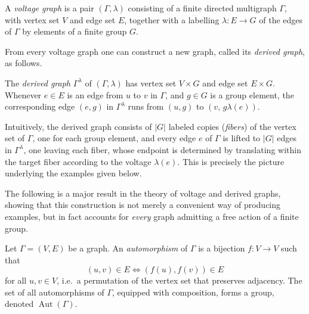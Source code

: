 \begin{definition}
    \label{def:classical-voltage-graph}
    A \emph{voltage graph} is a pair \( (\Gamma, \lambda) \) consisting
    of a finite directed multigraph \( \Gamma \),
    with vertex set \( V \) and edge set \( E \), together with a
    labelling \( \lambda \colon E \to G \) of the edges of \( \Gamma \)
    by elements of a finite group \( G \).
\end{definition}

From every voltage graph one can construct a new graph, called its
\emph{derived graph}, as follows.

\begin{definition}
    \label{def:classical-derived-graph}
    The \emph{derived graph} \( \Gamma^\lambda \) of \( (\Gamma,\lambda) \)
    has vertex set \( V \times G \) and edge set \( E \times G \).
    Whenever \( e \in E \) is an edge from \( u \) to \( v \) in
    \( \Gamma \), and \( g \in G \) is a group element, the
    corresponding edge \( (e,g) \) in \( \Gamma^\lambda \) runs from
    \( (u,g) \) to \( (v,\, g\lambda(e)) \).
\end{definition}

Intuitively, the derived graph consists of \( |G| \) labeled copies
(\emph{fibers}) of the vertex set of \( \Gamma \), one for each group
element, and every edge \( e \) of \( \Gamma \) is lifted to \( |G| \)
edges in \( \Gamma^\lambda \), one leaving each fiber, whose endpoint
is determined by translating within the target fiber according to the
voltage \( \lambda(e) \). This is precisely the picture underlying the
examples given below.

The following is a major result in the theory of voltage and derived
graphs, showing that this construction is not merely a convenient way
of producing examples, but in fact accounts for \emph{every} graph
admitting a free action of a finite group.

\begin{definition}
    \label{def:graph-automorphism}
    Let \( \Gamma = (V, E) \) be a graph. An \emph{automorphism} of
    \( \Gamma \) is a bijection \( f \colon V \to V \) such that
    \[
        (u,v) \in E \iff (f(u), f(v)) \in E
    \]
    for all \( u, v \in V \), i.e.\ a permutation of the vertex set
    that preserves adjacency. The set of all automorphisms of
    \( \Gamma \), equipped with composition, forms a group, denoted
    \( \operatorname{Aut}(\Gamma) \).
\end{definition}

